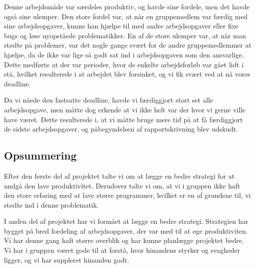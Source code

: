 Denne arbejdsmåde var særdeles produktiv, og havde sine fordele, men det havde også sine ulemper. Den store fordel var, at når en gruppemedlem var færdig med sine arbejdsopgaver, kunne han hjælpe til med andre arbejdsopgaver eller fixe bugs og løse nyopståede problematikker. En af de store ulemper var, at når man stødte på problemer, var det nogle gange svært for de andre gruppemedlemmer at hjælpe, da de ikke var lige så godt sat ind i arbejdsopgaven som den ansvarlige. Dette medførte at der var perioder, hvor de enkelte arbejdsforløb var gået lidt i stå, hvilket resulterede i at arbejdet blev forsinket, og vi fik svært ved at nå vores deadline.

Da vi nåede den fastsatte deadline, havde vi færdiggjort stort set alle arbejdsopgave, men måtte dog erkende at vi ikke helt var der hvor vi gerne ville have været. Dette resulterede i, at vi måtte bruge mere tid på at få færdiggjort de sidste arbejdsopgaver, og påbegyndelsen af rapportskrivning blev udskudt.

\subsection{Opsummering}

Efter den første del af projektet talte vi om at lægge en bedre strategi for at undgå den lave produktivitet. Derudover talte vi om, at vi i gruppen ikke haft den store erfaring med at lave større programmer, hvilket er en af grundene til, vi stødte ind i denne problematik.

I anden del af projektet har vi formået at lægge en bedre strategi. Strategien har bygget på bred fordeling af arbejdsopgaver, der var med til at øge produktiviten. Vi har denne gang haft større overblik og har kunne planlægge projektet bedre. Vi har i gruppen været gode til at forstå, hvor hinandens styrker og svagheder ligger, og vi har suppleret hinanden godt. 